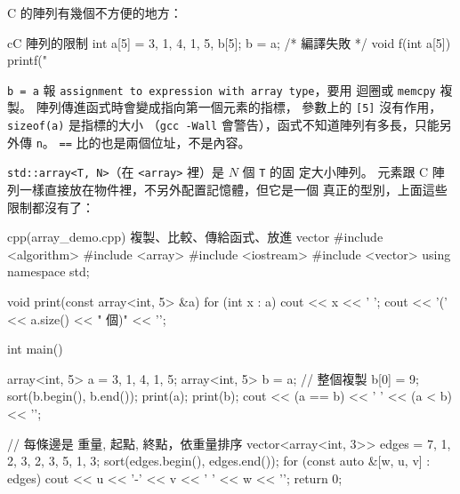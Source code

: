 \begin{crecap}[陣列不能整個指定]
C 的陣列有幾個不方便的地方：

\begin{code}{c}{C 陣列的限制}
int a[5] = {3, 1, 4, 1, 5}, b[5];
b = a;                  /* 編譯失敗 */
void f(int a[5]) {
    printf("%
}
\end{code}

\texttt{b = a} 報 \texttt{assignment to expression with array type}，要用
迴圈或 \texttt{memcpy} 複製。 陣列傳進函式時會變成指向第一個元素的指標，
參數上的 \texttt{[5]} 沒有作用，\texttt{sizeof(a)} 是指標的大小
（\texttt{gcc -Wall} 會警告），函式不知道陣列有多長，只能另外傳 \texttt{n}。
\texttt{==} 比的也是兩個位址，不是內容。
\end{crecap}

\texttt{std::array<T, N>}（在 \texttt{<array>} 裡）是 $N$ 個 \texttt{T} 的固
定大小陣列。 元素跟 C 陣列一樣直接放在物件裡，不另外配置記憶體，但它是一個
真正的型別，上面這些限制都沒有了：

\begin{example}[label=ex:array]{cpp}{(array\_demo.cpp) 複製、比較、傳給函式、放進 vector}
#include <algorithm>
#include <array>
#include <iostream>
#include <vector>
using namespace std;

void print(const array<int, 5> &a) {
    for (int x : a) {
        cout << x << ' ';
    }
    cout << '(' << a.size() << " 個)" << '\n';
}

int main() {
    array<int, 5> a = {3, 1, 4, 1, 5};
    array<int, 5> b = a;               // 整個複製
    b[0] = 9;
    sort(b.begin(), b.end());
    print(a);
    print(b);
    cout << (a == b) << ' ' << (a < b) << '\n';

    // 每條邊是 {重量, 起點, 終點}，依重量排序
    vector<array<int, 3>> edges = {{7, 1, 2}, {3, 2, 3}, {5, 1, 3}};
    sort(edges.begin(), edges.end());
    for (const auto &[w, u, v] : edges) {
        cout << u << '-' << v << ' ' << w << '\n';
    }
    return 0;
}
\end{example}


